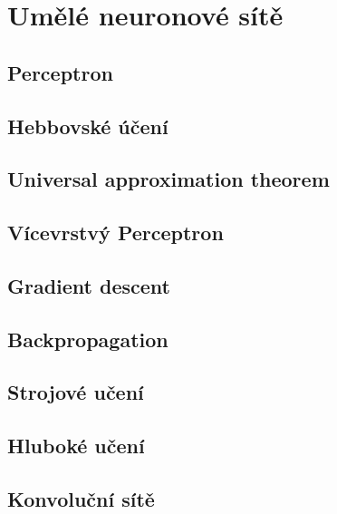 \section{Umělé neuronové sítě}
\subsection{Perceptron}
\subsection{Hebbovské účení}
\subsection{Universal approximation theorem}
\label{sec:universal_approximation_theorem}

\subsection{Vícevrstvý Perceptron}
\label{sec:multilayer_perceptron}
\subsection{Gradient descent}
\label{sec:gradient_descent}
\subsection{Backpropagation}
\subsection{Strojové učení}
\label{sec:machine_learning}
\subsection{Hluboké učení}
\label{sec:deep_learning}
\subsection{Konvoluční sítě}
\label{sec:cnn}

